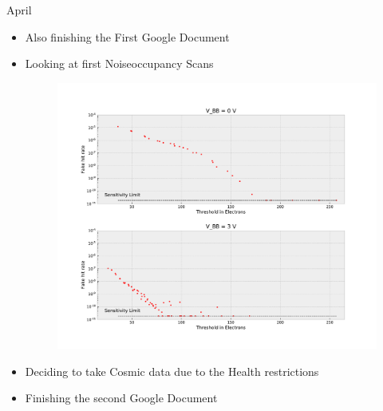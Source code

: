 \documentclass{beamer}
\begin{document}
\begin{frame}{April}
    \begin{itemize}
	\item Also finishing the First Google Document
	\item Looking at first Noiseoccupancy Scans
	    \begin{figure}[H]
		\centering
		\includegraphics[width=.5\textwidth]{MauriceFirstNoise.pdf}
	    \end{figure}
	\item Deciding to take Cosmic data due to the Health restrictions
	\item Finishing the second Google Document
    \end{itemize}
\end{frame}
\end{document}
